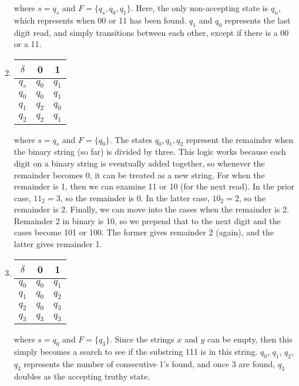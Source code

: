 \documentclass[11pt]{article}
\theoremstyle{definition}
\theoremstyle{case}
\theoremstyle{theorem}
\begin{document}
\begin{enumerate}[label=(\alph*)]
where $s = q_s$ and $F = \{q_s, q_0, q_1\}$. Here, the only non-accepting state
is $q_n$, which represents when 00 or 11 has been found. $q_1$ and $q_0$ represents
the last digit read, and simply transitions between each other, except if there is 
a 00 or a 11.

\vspace{15px}

\item
\begin{tabular}{|c||c|c|}
$\delta$ & 0 & 1 \\

\hline

$q_s$ & $q_0$ & $q_1$ \\

\hline

$q_0$ & $q_0$ & $q_1$ \\

\hline

$q_1$ & $q_2$ & $q_0$ \\

\hline

$q_2$ & $q_2$ & $q_1$

\end{tabular}

where $s = q_s$ and $F = \{q_0\}$. The states $q_0, q_1, q_2$ represent the remainder when
the binary string (so far) is divided by three. This logic works because each digit on a binary string
is eventually added together, so whenever the remainder becomes 0, it can be treated as a new string.
For when the remainder is 1, then we can examine 11 or 10 (for the next read). In the prior case, $11_2 = 3$,
so the remainder is 0. In the latter case, $10_2 = 2$, so the remainder is 2. Finally, we can move into
the cases when the remainder is 2. Remainder 2 in binary is 10, so we prepend that to
the next digit and the cases become 101 or 100. The former gives remainder 2 (again), and the latter gives remainder 1.  

\item
\begin{tabular}{|c||c|c|}
$\delta$ & 0 & 1 \\

\hline

$q_0$ & $q_0$ & $q_1$ \\

\hline

$q_1$ & $q_0$ & $q_2$ \\

\hline

$q_2$ & $q_0$ & $q_3$ \\

\hline

$q_3$ & $q_3$ & $q_3$ 
\end{tabular}

where $s = q_0$ and $F = \{q_3\}$. Since the strings $x$ and $y$ can be empty, then this 
simply becomes a search to see if the substring 111 is in this string. $q_0$, $q_1$, $q_2$, $q_3$ 
represents the number of consecutive 1's found, and once 3 are found, $q_3$ doubles as the 
accepting truthy state.

\end{enumerate}
\end{document}
